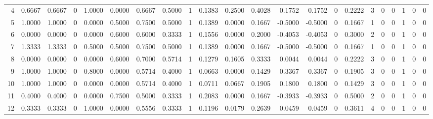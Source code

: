 \documentclass{article}
\begin{document}
\begin{center}
\begin{tabular}{rrrrrrrrrrrrrrrrrrrrrr}
  4 & 0.6667 & 0.6667 &     0 & 1.0000 & 0.0000 & 0.6667 & 0.5000 &     1 & 0.1383 & 0.2500 & 0.4028 & 0.1752 & 0.1752 &     0 & 0.2222 & 3 & 0 & 0 &     1 &     0 &     0 \\ 
  5 & 1.0000 & 1.0000 &     0 & 0.0000 & 0.5000 & 0.7500 & 0.5000 &     1 & 0.1389 & 0.0000 & 0.1667 & -0.5000 & -0.5000 &     0 & 0.1667 & 1 & 0 & 0 &     1 &     0 &     0 \\ 
  6 & 0.0000 & 0.0000 &     0 & 0.0000 & 0.6000 & 0.6000 & 0.3333 &     1 & 0.1556 & 0.0000 & 0.2000 & -0.4053 & -0.4053 &     0 & 0.3000 & 2 & 0 & 0 &     1 &     0 &     0 \\ 
  7 & 1.3333 & 1.3333 &     0 & 0.5000 & 0.5000 & 0.7500 & 0.5000 &     1 & 0.1389 & 0.0000 & 0.1667 & -0.5000 & -0.5000 &     0 & 0.1667 & 1 & 0 & 0 &     1 &     0 &     0 \\ 
  8 & 0.0000 & 0.0000 &     0 & 0.0000 & 0.6000 & 0.7000 & 0.5714 &     1 & 0.1279 & 0.1605 & 0.3333 & 0.0044 & 0.0044 &     0 & 0.2222 & 3 & 0 & 0 &     1 &     0 &     0 \\ 
  9 & 1.0000 & 1.0000 &     0 & 0.8000 & 0.0000 & 0.5714 & 0.4000 &     1 & 0.0663 & 0.0000 & 0.1429 & 0.3367 & 0.3367 &     0 & 0.1905 & 3 & 0 & 0 &     1 &     0 &     0 \\ 
  10 & 1.0000 & 1.0000 &     0 & 0.0000 & 0.0000 & 0.5714 & 0.4000 &     1 & 0.0711 & 0.0667 & 0.1905 & 0.1800 & 0.1800 &     0 & 0.1429 & 3 & 0 & 0 &     1 &     0 &     0 \\ 
  11 & 0.4000 & 0.4000 &     0 & 0.0000 & 0.7500 & 0.5000 & 0.3333 &     1 & 0.2083 & 0.0000 & 0.1667 & -0.3933 & -0.3933 &     0 & 0.5000 & 2 & 0 & 0 &     1 &     0 &     0 \\ 
  12 & 0.3333 & 0.3333 &     0 & 1.0000 & 0.0000 & 0.5556 & 0.3333 &     1 & 0.1196 & 0.0179 & 0.2639 & 0.0459 & 0.0459 &     0 & 0.3611 & 4 & 0 & 0 &     1 &     0 &     0 \\ 
   \hline
\end{tabular}


\end{center}
\end{document}
